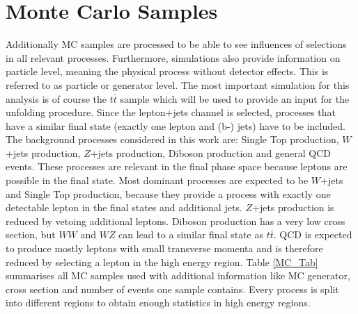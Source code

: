 	\section{Monte Carlo Samples}
	Additionally MC samples are processed to be able to see influences of selections in all relevant processes. Furthermore, simulations also provide information on particle level, meaning the physical process without detector effects. This is referred to as particle or generator level. The most important simulation for this analysis is of course the $t\bar{t}$ sample which will be used to provide an input for the unfolding procedure. Since the lepton+jets channel is selected, processes that have a similar final state (exactly one lepton and (b-) jets) have to be included. The background processes considered in this work are: Single Top production, $W$+jets production, $Z$+jets production, Diboson production and general QCD events. These processes are relevant in the final phase space because leptons are possible in the final state. Most dominant processes are expected to be $W$+jets and Single Top production, because they provide a process with exactly one detectable lepton in the final states and additional jets. $Z$+jets production is reduced by vetoing additional leptons. Diboson production has a very low cross section, but $WW$ and $WZ$ can lead to a similar final state as $t\bar{t}$. QCD is expected to produce mostly leptons with small transverse momenta and is therefore reduced by selecting a lepton in the high energy region. Table \ref{MC_Tab} summarises all MC samples used with additional information like MC generator, cross section and number of events one sample contains. Every process is split into different regions to obtain enough statistics in high energy regions.	
